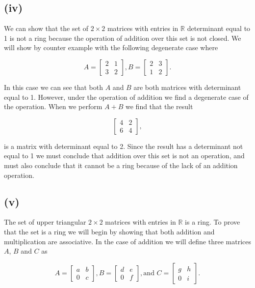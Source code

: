\documentclass{article}
\begin{document}
      \subsection*{(iv)}
        We can show that the set of $2\times2$ matrices with entries in $\mathbb{R}$ determinant equal to 1 is not a ring because the operation of addition over this set is not closed. We will show by counter example with the following degenerate case where

        \[
          A = 
          \begin{bmatrix} 
            2 & 1\\
            3 & 2
          \end{bmatrix},
          B = \begin{bmatrix} 
            2 & 3\\
            1 & 2
          \end{bmatrix}.
        \]

        In this case we can see that both $A$ and $B$ are both matrices with determinant equal to 1. However, under the operation of addition we find a degenerate case of the operation. When we perform $A+B$ we find that the result

        \[
          \begin{bmatrix} 
            4 & 2\\
            6 & 4
          \end{bmatrix},
        \]

        is a matrix with determinant equal to 2. Since the result has a determinant not equal to 1 we must conclude that addition over this set is not an operation, and must also conclude that it cannot be a ring because of the lack of an addition operation.

      \subsection*{(v)}
          The set of upper triangular $2 \times 2$ matrices with entries in $\mathbb{R}$ is a ring. To prove that the set is a ring we will begin by showing that both addition and multiplication are associative. In the case of addition we will define three matrices $A$, $B$ and $C$ as 

          \[
          A = 
          \begin{bmatrix} 
            a & b\\
            0 & c
          \end{bmatrix},
          B = \begin{bmatrix} 
            d & e\\
            0 & f
          \end{bmatrix}, \text{and }
          C = \begin{bmatrix} 
            g & h\\
            0 & i
          \end{bmatrix}.
        \]
        
\end{document}
